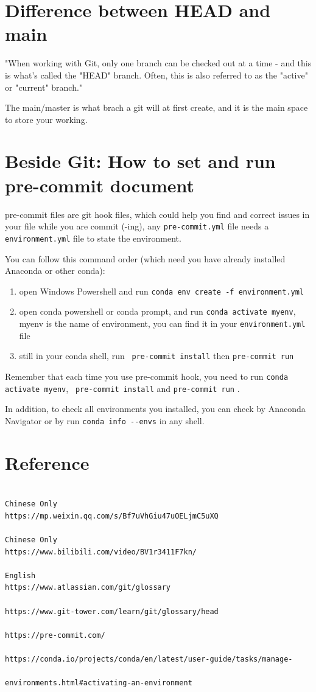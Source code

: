 \documentclass[UTF8]{article}
\begin{document}
\section{Difference between HEAD and main}
"When working with Git, only one branch can be checked out at a time - and this is what's called the "HEAD" branch. Often, this is also referred to as the "active" or "current" branch."

The main/master is what brach a git will at first create, and it is the main space to store your working. 

\section{Beside Git: How to set and run pre-commit document}
pre-commit files are git hook files, which could help you find and correct issues in your file while you are commit (-ing), any \verb|pre-commit.yml| file needs a \verb|environment.yml| file to state the environment. 

You can follow this command order (which need you have already installed Anaconda or other conda):

\begin{enumerate}
\item open Windows Powershell and run \verb|conda env create -f environment.yml|
\item open conda powershell or conda prompt, and run \verb|conda activate myenv|, myenv is the name of environment, you can find it in your \verb|environment.yml| file
\item still in your conda shell, run \verb| pre-commit install| then \verb|pre-commit run|
\end{enumerate}

Remember that each time you use pre-commit hook, you need to run \verb|conda activate myenv|, \verb| pre-commit install| and \verb|pre-commit run| . 

In addition, to check all environments you installed, you can check by Anaconda Navigator or by run \verb|conda info --envs| in any shell. 




\section{Reference}

\begin{verbatim}

Chinese Only
https://mp.weixin.qq.com/s/Bf7uVhGiu47uOELjmC5uXQ 

Chinese Only
https://www.bilibili.com/video/BV1r3411F7kn/

English
https://www.atlassian.com/git/glossary 

https://www.git-tower.com/learn/git/glossary/head 

https://pre-commit.com/

https://conda.io/projects/conda/en/latest/user-guide/tasks/manage-

environments.html#activating-an-environment

\end{verbatim}
\end{document}
